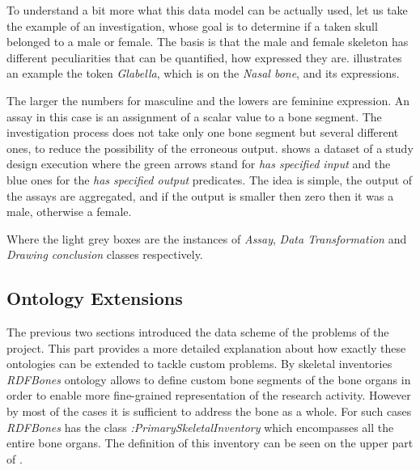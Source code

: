 

To understand a bit more what this data model can be actually used, let us take the example of an investigation, whose goal is to determine if a taken skull belonged to a male or female. The basis is that the male and female skeleton has different peculiarities that can be quantified, how expressed they are.  illustrates an example the token \textit{Glabella}, which is on the \textit{Nasal bone}, and its expressions.  



The larger the numbers for masculine and the lowers are feminine expression. An assay in this case is an assignment of a scalar value to a bone segment. The investigation process does not take only one bone segment but several different ones, to reduce the possibility of the erroneous output.  shows a dataset of a study design execution where the green arrows stand for \textit{has specified input} and the blue ones for the \textit{has specified output} predicates. The idea is simple, the output of the assays are aggregated, and if the output is smaller then zero then it was a male, otherwise a female.



Where the light grey boxes are the instances of \textit{Assay}, \textit{Data Transformation} and \textit{Drawing conclusion} classes respectively.




\subsection{Ontology Extensions} \label{333}


The previous two sections introduced the data scheme of the problems of the project. This part provides a more detailed explanation about how exactly these ontologies can be extended to tackle custom problems. By skeletal inventories \textit{RDFBones} ontology allows to define custom bone segments of the bone organs in order to enable more fine-grained representation of the research activity. However by most of the cases it is sufficient to address the bone as a whole. For such cases \textit{RDFBones} has the class \textit{:PrimarySkeletalInventory} which encompasses all the entire bone organs. The definition of this inventory can be seen on the upper part of .

